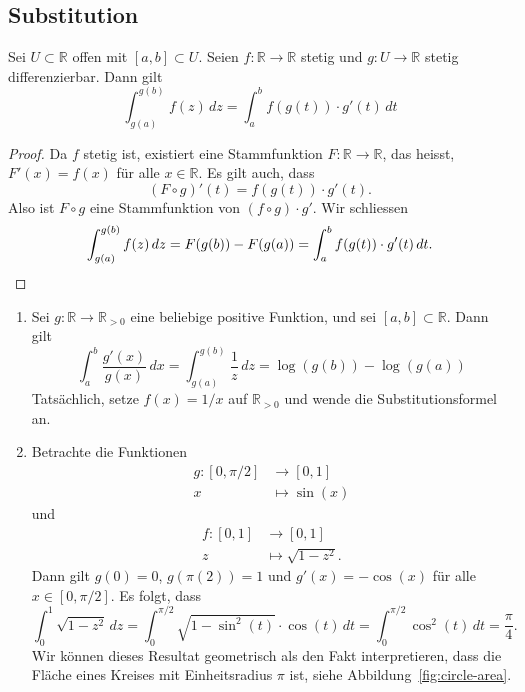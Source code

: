 \documentclass[../main.tex]{subfiles}
\begin{document}
\subsection*{Substitution}
\begin{substitution}
  Sei $U \subset \mathbb{R}$ offen
  mit $[a, b] \subset U$.
  Seien $f \colon \mathbb{R} \to \mathbb{R}$ stetig
  und $g \colon U \to \mathbb{R}$ stetig differenzierbar.
  Dann gilt
  \[
    \int_{g(a)}^{g(b)} f(z) \, dz
    = \int_{a}^{b} f(g(t)) \cdot g'(t) \, dt
  \]
\end{substitution}

\begin{proof}
  Da $f$ stetig ist, existiert
  eine Stammfunktion $F \colon \mathbb{R} \to \mathbb{R}$,
  das heisst,
  $F'(x) = f(x)$ für alle $x \in \mathbb{R}$.
  Es gilt auch, dass
  \[
    (F \circ g)'(t) = f(g(t)) \cdot g'(t).
  \]
  Also ist $F \circ g$ eine Stammfunktion
  von $(f \circ g) \cdot g'$.
  Wir schliessen
  \[
    \int_{g(a)}^{g(b)} f(z) \, dz
    = F(g(b)) - F(g(a))
    = \int_{a}^{b} f(g(t)) \cdot g'(t) \, dt. \qedhere
  \]
\end{proof}

\begin{examples}
  \leavevmode
  \begin{enumerate}[(1)]
    \item Sei $g \colon \mathbb{R} \to \mathbb{R}_{>0}$ 
      eine beliebige positive Funktion,
      und sei $[a, b] \subset \mathbb{R}$.
      Dann gilt
      \[
        \int_{a}^{b} \frac{g'(x)}{g(x)} \, dx
        = \int_{g(a)}^{g(b)} \frac{1}{z} \, dz
        = \log(g(b)) - \log(g(a))
      \]
      Tatsächlich, setze $f(x) = 1/x$ auf $\mathbb{R}_{>0}$
      und wende die Substitutionsformel an.
    \item Betrachte die Funktionen
      \begin{align*}
        g \colon [0, \pi/2] & \to [0, 1] \\
        x & \mapsto \sin(x)
      \end{align*}
      und
      \begin{align*}
        f \colon [0, 1] & \to [0, 1] \\
        z & \mapsto \sqrt{1- z^2}.
      \end{align*}
      Dann gilt $g(0) = 0$, $g(\pi(2)) = 1$ 
      und $g'(x) = -\cos(x)$ für alle $x \in [0, \pi/2]$.
      Es folgt, dass
      \[
        \int_{0}^{1} \sqrt{1 - z^2} \, dz
        = \int_{0}^{\pi/2} \sqrt{1 - \sin^2(t)}
        \cdot \cos(t)\, dt
        = \int_{0}^{\pi/2} \cos^2(t) \, dt
        = \frac{\pi}{4}.
      \]
      Wir können dieses Resultat geometrisch als den Fakt
      interpretieren, dass die Fläche eines Kreises 
      mit Einheitsradius $\pi$ ist, siehe
      Abbildung~\ref{fig:circle-area}.
  \end{enumerate}
\end{examples}
\end{document}
